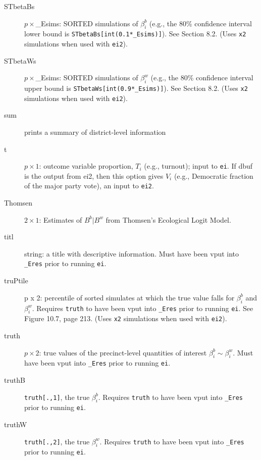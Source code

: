 \documentclass[11pt,titlepage]{article}
\begin{document}
\begin{description}
\item[STbetaBs] $p\times$\_Esims: SORTED simulations of $\beta_i^b$
  (e.g., the 80\% confidence interval lower bound is
  \texttt{STbetaBs[int(0.1*\_Esims)]}).  See Section 8.2.
  (Uses \texttt{x2} simulations when used with \texttt{ei2}).

\item[STbetaWs] $p\times$\_Esims: SORTED simulations of $\beta_i^w$
  (e.g., the 80\% confidence interval upper bound is
  \texttt{STbetaWs[int(0.9*\_Esims)]}).  See Section 8.2.
  (Uses \texttt{x2} simulations when used with \texttt{ei2}).

\item[sum] prints a summary of district-level information

\item[t] $p\times 1$: outcome variable proportion, $T_i$ (e.g.,
  turnout); input to \texttt{ei}.  If dbuf is the output from ei2,
  then this option gives $V_i$ (e.g., Democratic fraction of the major
  party vote), an input to \texttt{ei2}.

\item[Thomsen] $2\times 1$: Estimates of $B^b|B^w$ from Thomsen's
  Ecological Logit Model.

\item[titl] string: a title with descriptive information. Must have
  been vput into \texttt{\_Eres} prior to running \texttt{ei}.

\item[truPtile] p x 2: percentile of sorted simulates at which the
  true value falls for $\beta_i^b$ and $\beta_i^w$.  Requires
  \texttt{truth} to have been vput into \texttt{\_Eres} prior to
  running \texttt{ei}. See Figure 10.7, page 213.  (Uses \texttt{x2}
  simulations when used with \texttt{ei2}).

\item[truth] $p\times 2$: true values of the precinct-level quantities
  of interest $\beta_i^b\sim\beta_i^w$.  Must have been vput into
  \texttt{\_Eres} prior to running \texttt{ei}.

\item[truthB] \texttt{truth[.,1]}, the true $\beta_i^b$.  Requires
  \texttt{truth} to have been vput into \texttt{\_Eres} prior to
  running \texttt{ei}.

\item[truthW] \texttt{truth[.,2]}, the true $\beta_i^w$.  Requires
  \texttt{truth} to have been vput into \texttt{\_Eres} prior to
  running \texttt{ei}.


\end{description}
\end{document}
